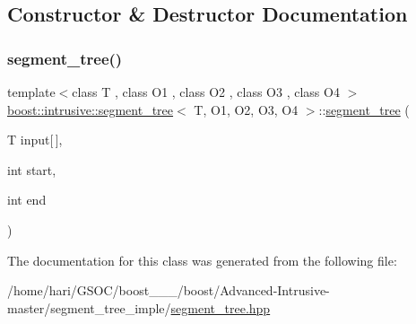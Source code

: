 \subsection{Constructor \& Destructor Documentation}
\mbox{\label{classboost_1_1intrusive_1_1segment__tree_a30f63674d219804557316b5c58154d5c}} 
\subsubsection{\texorpdfstring{segment\+\_\+tree()}{segment\_tree()}}
{\footnotesize\ttfamily template$<$class T , class O1 , class O2 , class O3 , class O4 $>$ \\
\hyperlink{classboost_1_1intrusive_1_1segment__tree}{boost\+::intrusive\+::segment\+\_\+tree}$<$ T, O1, O2, O3, O4 $>$\+::\hyperlink{classboost_1_1intrusive_1_1segment__tree}{segment\+\_\+tree} (\begin{DoxyParamCaption}\item[{T}]{input\mbox{[}$\,$\mbox{]},  }\item[{int}]{start,  }\item[{int}]{end }\end{DoxyParamCaption})\hspace{0.3cm}{\ttfamily [inline]}}



The documentation for this class was generated from the following file\+:\begin{DoxyCompactItemize}
\item 
/home/hari/\+G\+S\+O\+C/boost\+\_\+\_\+\_/boost/\+Advanced-\/\+Intrusive-\/master/segment\+\_\+tree\+\_\+imple/\hyperlink{segment__tree_8hpp}{segment\+\_\+tree.\+hpp}\end{DoxyCompactItemize}
